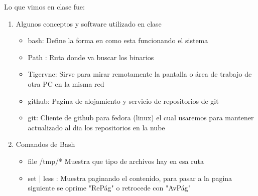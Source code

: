 \documentclass[letterpaper, 12pt, oneside]{article}%
\begin{document}
Lo que vimos en clase fue:%
\begin{enumerate}%
	\item Algunos conceptos y software utilizado en clase%
		\begin{itemize}
			\item bash: Define la forma en como esta funcionando el sistema
			\item Path : Ruta donde va buscar los binarios
			\item Tigervnc: Sirve para mirar remotamente la pantalla o área de trabajo de otra PC en la misma red
			\item github: Pagina de alojamiento y servicio de repositorios de git
			\item git: Cliente de github para fedora (linux) el cual usaremos para mantener actualizado al dia los repositorios en la nube
		
		\end{itemize}
	
	\item Comandos de Bash%
	\begin{itemize}%
		\item file /tmp/* Muestra que tipo de archivos hay en esa ruta
		\item set | less : Muestra paginando el contenido, para pasar a la pagina siguiente se oprime "RePág" o retrocede con "AvPág"
		

\end{itemize}
\end{enumerate}
\end{document}
